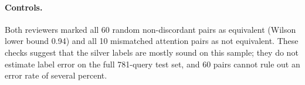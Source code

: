 \paragraph{Controls.} Both reviewers marked all 60 random non-discordant pairs as equivalent (Wilson lower bound 0.94) and all 10 mismatched attention pairs as not equivalent. These checks suggest that the silver labels are mostly sound on this sample; they do not estimate label error on the full 781-query test set, and 60 pairs cannot rule out an error rate of several percent.
